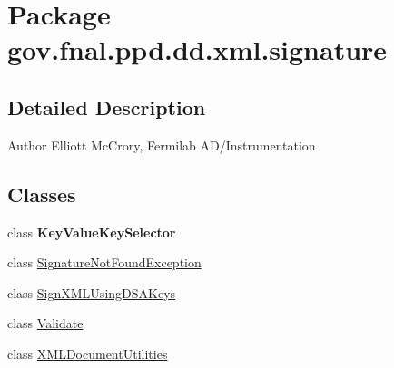 \hypertarget{namespacegov_1_1fnal_1_1ppd_1_1dd_1_1xml_1_1signature}{\section{Package gov.\-fnal.\-ppd.\-dd.\-xml.\-signature}
\label{namespacegov_1_1fnal_1_1ppd_1_1dd_1_1xml_1_1signature}
}


\subsection{Detailed Description}
\begin{DoxyAuthor}{Author}
Elliott Mc\-Crory, Fermilab A\-D/\-Instrumentation 
\end{DoxyAuthor}
\subsection*{Classes}
\begin{DoxyCompactItemize}
\item 
class {\bfseries Key\-Value\-Key\-Selector}
\item 
class \hyperlink{classgov_1_1fnal_1_1ppd_1_1dd_1_1xml_1_1signature_1_1SignatureNotFoundException}{Signature\-Not\-Found\-Exception}
\item 
class \hyperlink{classgov_1_1fnal_1_1ppd_1_1dd_1_1xml_1_1signature_1_1SignXMLUsingDSAKeys}{Sign\-X\-M\-L\-Using\-D\-S\-A\-Keys}
\item 
class \hyperlink{classgov_1_1fnal_1_1ppd_1_1dd_1_1xml_1_1signature_1_1Validate}{Validate}
\item 
class \hyperlink{classgov_1_1fnal_1_1ppd_1_1dd_1_1xml_1_1signature_1_1XMLDocumentUtilities}{X\-M\-L\-Document\-Utilities}
\end{DoxyCompactItemize}
